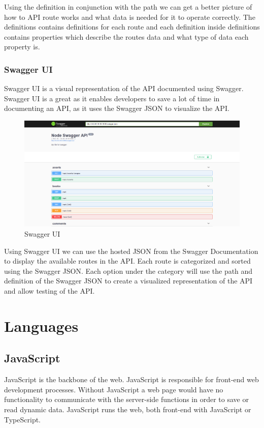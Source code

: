 Using the definition in conjunction with the path we can get a better picture of how to API route works and what data is needed for it to operate correctly. The definitions contains definitions for each route and each definition inside definitions contains properties which describe the routes data and what type of data each property is.

\subsubsection{Swagger UI}
Swagger UI is a visual representation of the API documented using Swagger. Swagger UI is a great as it enables developers to save a lot of time in documenting an API, as it uses the Swagger JSON to visualize the API. 

\begin{figure}[H]
  \includegraphics[width=\linewidth]{img/swaggerUI.PNG}
  \caption{Swagger UI}
  \label{fig:NPM}
\end{figure}

Using Swagger UI we can use the hosted JSON from the Swagger Documentation to display the available routes in the API. Each route is categorized and sorted using the Swagger JSON. Each option under the category will use the path and definition of the Swagger JSON to create a visualized representation of the API and allow testing of the API.

\section{Languages}
\subsection{JavaScript}
JavaScript is the backbone of the web. JavaScript is responsible for front-end web development processes. Without JavaScript a web page would have no functionality to communicate with the server-side functions in order to save or read dynamic data. JavaScript runs the web, both front-end with JavaScript or TypeScript. 

